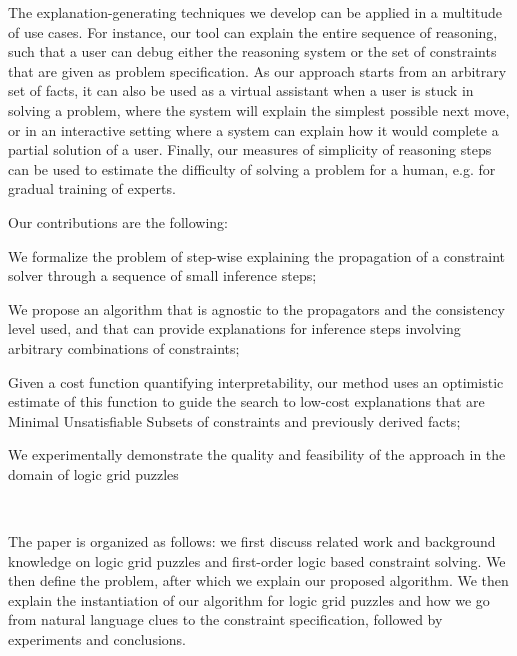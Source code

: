 The explanation-generating techniques we develop can be applied in a multitude of use cases. 
For instance, our tool can explain the entire sequence of reasoning, such that a user can debug either the reasoning system or the set of constraints that are given as problem specification. 
As our approach starts from an arbitrary set of facts, it can also be used as a virtual assistant when a user is stuck in solving a problem, where the system will explain the simplest possible next move, or in an interactive setting where a system can explain how it would complete a partial solution of a user.
Finally, our measures of simplicity of reasoning steps can be used to estimate the difficulty of solving a problem for a human, e.g. for gradual training of experts.


\noindent Our contributions are the following:
\begin{compactitem}
	\item We formalize the problem of step-wise explaining the propagation of a constraint solver through a sequence of small inference steps;
	\item We propose an algorithm that is agnostic to the propagators and the consistency level used, and that can provide explanations for inference steps involving arbitrary combinations of constraints;
	\item Given a cost function quantifying interpretability, our method uses an optimistic estimate of this function to guide the search to low-cost explanations that are Minimal Unsatisfiable Subsets of constraints and previously derived facts;
	\item We experimentally demonstrate the quality and feasibility of the approach in the domain of logic grid puzzles
\end{compactitem}
\ 

The paper is organized as follows: we first discuss related work and background knowledge on logic grid puzzles and first-order logic based constraint solving. We then define the problem, after which we explain our proposed algorithm. We then explain the instantiation of our algorithm for logic grid puzzles and how we go from natural language clues to the constraint specification, followed by experiments and conclusions.


